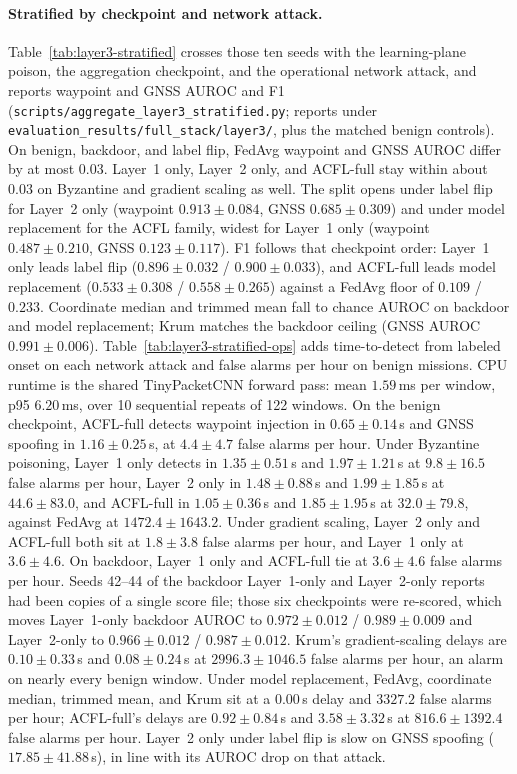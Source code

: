 \paragraph{Stratified by checkpoint and network attack.}
Table~\ref{tab:layer3-stratified} crosses those ten seeds with the learning-plane poison, the aggregation checkpoint, and the operational network attack, and reports waypoint and GNSS AUROC and F1 (\texttt{scripts/aggregate\_layer3\_stratified.py}; reports under \texttt{evaluation\_results/full\_stack/layer3/}, plus the matched benign controls).
On benign, backdoor, and label flip, FedAvg waypoint and GNSS AUROC differ by at most $0.03$.
Layer~1 only, Layer~2 only, and ACFL-full stay within about $0.03$ on Byzantine and gradient scaling as well.
The split opens under label flip for Layer~2 only (waypoint $0.913 \pm 0.084$, GNSS $0.685 \pm 0.309$) and under model replacement for the ACFL family, widest for Layer~1 only (waypoint $0.487 \pm 0.210$, GNSS $0.123 \pm 0.117$).
F1 follows that checkpoint order: Layer~1 only leads label flip ($0.896 \pm 0.032$ / $0.900 \pm 0.033$), and ACFL-full leads model replacement ($0.533 \pm 0.308$ / $0.558 \pm 0.265$) against a FedAvg floor of $0.109$ / $0.233$.
Coordinate median and trimmed mean fall to chance AUROC on backdoor and model replacement; Krum matches the backdoor ceiling (GNSS AUROC $0.991 \pm 0.006$).
Table~\ref{tab:layer3-stratified-ops} adds time-to-detect from labeled onset on each network attack and false alarms per hour on benign missions.
CPU runtime is the shared TinyPacketCNN forward pass: mean $1.59$\,ms per window, p95 $6.20$\,ms, over 10 sequential repeats of 122 windows.
On the benign checkpoint, ACFL-full detects waypoint injection in $0.65 \pm 0.14$\,s and GNSS spoofing in $1.16 \pm 0.25$\,s, at $4.4 \pm 4.7$ false alarms per hour.
Under Byzantine poisoning, Layer~1 only detects in $1.35 \pm 0.51$\,s and $1.97 \pm 1.21$\,s at $9.8 \pm 16.5$ false alarms per hour, Layer~2 only in $1.48 \pm 0.88$\,s and $1.99 \pm 1.85$\,s at $44.6 \pm 83.0$, and ACFL-full in $1.05 \pm 0.36$\,s and $1.85 \pm 1.95$\,s at $32.0 \pm 79.8$, against FedAvg at $1472.4 \pm 1643.2$.
Under gradient scaling, Layer~2 only and ACFL-full both sit at $1.8 \pm 3.8$ false alarms per hour, and Layer~1 only at $3.6 \pm 4.6$.
On backdoor, Layer~1 only and ACFL-full tie at $3.6 \pm 4.6$ false alarms per hour.
Seeds 42--44 of the backdoor Layer~1-only and Layer~2-only reports had been copies of a single score file; those six checkpoints were re-scored, which moves Layer~1-only backdoor AUROC to $0.972 \pm 0.012$ / $0.989 \pm 0.009$ and Layer~2-only to $0.966 \pm 0.012$ / $0.987 \pm 0.012$.
Krum's gradient-scaling delays are $0.10 \pm 0.33$\,s and $0.08 \pm 0.24$\,s at $2996.3 \pm 1046.5$ false alarms per hour, an alarm on nearly every benign window.
Under model replacement, FedAvg, coordinate median, trimmed mean, and Krum sit at a $0.00$\,s delay and $3327.2$ false alarms per hour; ACFL-full's delays are $0.92 \pm 0.84$\,s and $3.58 \pm 3.32$\,s at $816.6 \pm 1392.4$ false alarms per hour.
Layer~2 only under label flip is slow on GNSS spoofing ($17.85 \pm 41.88$\,s), in line with its AUROC drop on that attack.


